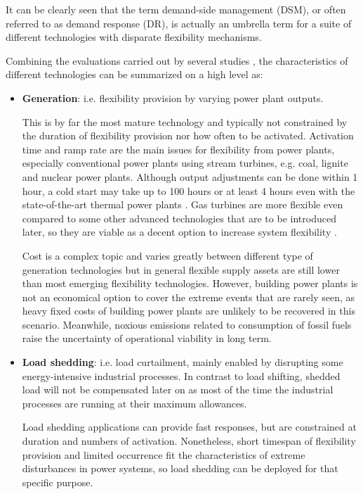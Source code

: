 It can be clearly seen that the term demand-side management (DSM), or often referred to as demand response (DR), is actually an umbrella term for a suite of different technologies with disparate flexibility mechanisms. 

Combining the evaluations carried out by several studies \cite{Cochran2014,Wang2017,Lund2015,Muller2016,Despres2017}, the characteristics of different technologies can be summarized on a high level as:

\begin{itemize}
	\item \textbf{Generation}: i.e. flexibility provision by varying power plant outputs. 
	
	This is by far the most mature technology and typically not constrained by the duration of flexibility provision nor how often to be activated. Activation time and ramp rate are the main issues for flexibility from power plants, especially conventional power plants using stream turbines, e.g. coal, lignite and nuclear power plants. Although output adjustments can be done within 1 hour, a cold start may take up to 100 hours or at least 4 hours even with the state-of-the-art thermal power plants \cite{Muller2016,AgoraEnergiewende2017}. Gas turbines are more flexible even compared to some other advanced technologies that are to be introduced later, so they are viable as a decent option to increase system flexibility \cite{Muller2016}.
	
	Cost is a complex topic and varies greatly between different type of generation technologies but in general flexible supply assets are still lower than most emerging flexibility technologies. However, building power plants is not an economical option to cover the extreme events that are rarely seen, as heavy fixed costs of building power plants are unlikely to be recovered in this scenario. Meanwhile, noxious emissions related to consumption of fossil fuels raise the uncertainty of operational viability in long term.
	
	\item \textbf{Load shedding}: i.e. load curtailment, mainly enabled by disrupting some energy-intensive industrial processes. In contrast to load shifting, shedded load will not be compensated later on as most of the time the industrial processes are running at their maximum allowances.
	
	Load shedding applications can provide fast responses, but are constrained at duration and numbers of activation. Nonetheless, short timespan of flexibility provision and limited occurrence fit the characteristics of extreme disturbances in power systems, so load shedding can be deployed for that specific purpose.
	

\end{itemize}
